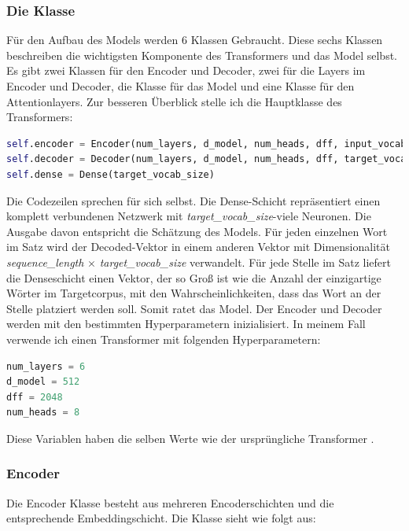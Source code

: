 \subsubsection{Die Klasse}
Für den Aufbau des Models werden 6 Klassen Gebraucht. Diese sechs Klassen beschreiben die wichtigsten Komponente des Transformers und das Model selbst. Es gibt zwei Klassen für den Encoder und Decoder, zwei für die Layers im Encoder und Decoder, die Klasse für das Model und eine Klasse für den Attentionlayers. Zur besseren Überblick stelle ich die Hauptklasse des Transformers:

\begin{lstlisting}[language=Python, caption={Definition des Transformers}]
self.encoder = Encoder(num_layers, d_model, num_heads, dff, input_vocab_size, pe_input, rate)
self.decoder = Decoder(num_layers, d_model, num_heads, dff, target_vocab_size, pe_target)
self.dense = Dense(target_vocab_size)
\end{lstlisting}

Die Codezeilen sprechen für sich selbst. Die Dense-Schicht repräsentiert einen komplett verbundenen Netzwerk mit \textit{target\_vocab\_size}-viele Neuronen. Die Ausgabe davon entspricht die Schätzung des Models. Für jeden einzelnen Wort im Satz wird der Decoded-Vektor in einem anderen Vektor mit Dimensionalität \textit{sequence\_length} $\times$ \textit{target\_vocab\_size} verwandelt. Für jede Stelle im Satz liefert die Denseschicht einen Vektor, der so Groß ist wie die Anzahl der einzigartige Wörter im Targetcorpus, mit den Wahrscheinlichkeiten, dass das Wort an der Stelle platziert werden soll. Somit ratet das Model. Der Encoder und Decoder werden mit den bestimmten Hyperparametern inizialisiert. In meinem Fall verwende ich einen Transformer mit folgenden Hyperparametern:

\begin{lstlisting}[language=Python, caption={Hyperparameter}]
num_layers = 6
d_model = 512
dff = 2048
num_heads = 8
\end{lstlisting}

Diese Variablen haben die selben Werte wie der ursprüngliche Transformer \cite{Vaswani:2017}.

\subsubsection{Encoder}

Die Encoder Klasse besteht aus mehreren Encoderschichten und die entsprechende Embeddingschicht. Die Klasse sieht wie folgt aus:

